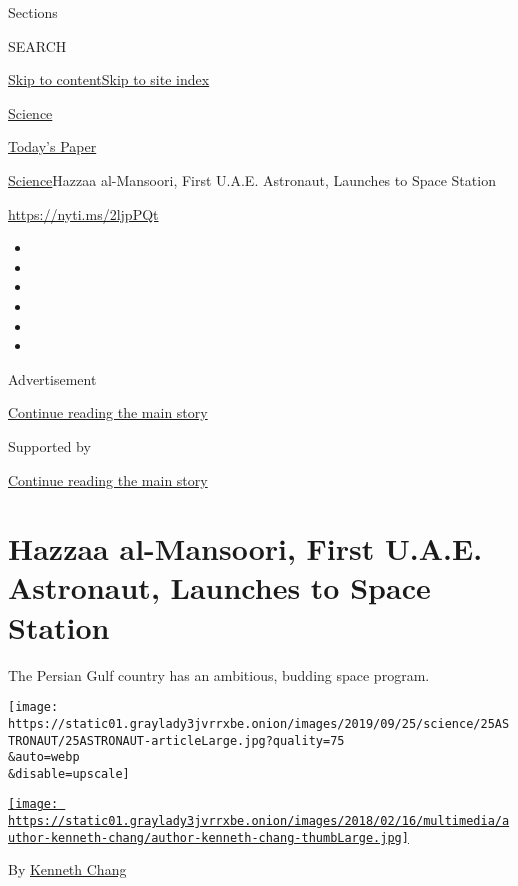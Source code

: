 Sections

SEARCH

\protect\hyperlink{site-content}{Skip to
content}\protect\hyperlink{site-index}{Skip to site index}

\href{https://www.nytimes3xbfgragh.onion/section/science}{Science}

\href{https://myaccount.nytimes3xbfgragh.onion/auth/login?response_type=cookie\&client_id=vi}{}

\href{https://www.nytimes3xbfgragh.onion/section/todayspaper}{Today's
Paper}

\href{/section/science}{Science}\textbar{}Hazzaa al-Mansoori, First
U.A.E. Astronaut, Launches to Space Station

\url{https://nyti.ms/2ljpPQt}

\begin{itemize}
\item
\item
\item
\item
\item
\item
\end{itemize}

Advertisement

\protect\hyperlink{after-top}{Continue reading the main story}

Supported by

\protect\hyperlink{after-sponsor}{Continue reading the main story}

\hypertarget{hazzaa-al-mansoori-first-uae-astronaut-launches-to-space-station}{%
\section{Hazzaa al-Mansoori, First U.A.E. Astronaut, Launches to Space
Station}\label{hazzaa-al-mansoori-first-uae-astronaut-launches-to-space-station}}

The Persian Gulf country has an ambitious, budding space program.

\texttt{[image: https://static01.graylady3jvrrxbe.onion/images/2019/09/25/science/25ASTRONAUT/25ASTRONAUT-articleLarge.jpg?quality=75\\\&auto=webp\\\&disable=upscale]}

\href{https://www.nytimes3xbfgragh.onion/by/kenneth-chang}{\texttt{[image: https://static01.graylady3jvrrxbe.onion/images/2018/02/16/multimedia/author-kenneth-chang/author-kenneth-chang-thumbLarge.jpg]}}

By \href{https://www.nytimes3xbfgragh.onion/by/kenneth-chang}{Kenneth
Chang}

